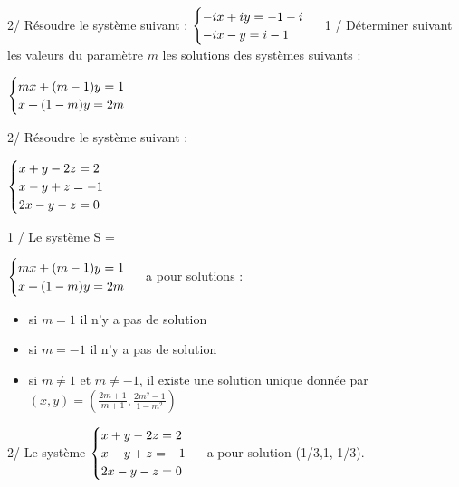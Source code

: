 \documentclass[11pt,a4paper]{amsart}
\theoremstyle{theorem}
\theoremstyle{definition}
\newcounter{numExercice}
\newcounter{qcounter}
\newcommand{\exo}[2]{\stepcounter{numExercice}\setcounter{qcounter}{0}\vspace{.3cm}\hangindent0em\hangafter=0%
\noindent{\textbf{Exercice \arabic{numExercice} (#2).} \textit{#1}}}
\begin{document}
{ \vspace{1cm}

 2/ Résoudre le système suivant :
 $
 \begin{cases}
 -ix+iy=-1-i\\
 -ix-y=i-1
 \end{cases} \\
 $
 1 / D\'eterminer suivant les valeurs du param\`etre $m$ les solutions des syst\`emes suivants :

 $
 \begin{cases}
 mx+(m-1)y=1\\
 x+(1-m)y=2m
 \end{cases} \\
 $

 \vspace{1cm}

 2/ Résoudre le système suivant :

 $
 \begin{cases}
 x+y-2z=2\\
 x-y+z=-1 \\
 2x-y-z=0
 \end{cases}\\
 $


 1 / Le système S = 

 $
 \begin{cases}
 mx+(m-1)y=1\\
 x+(1-m)y=2m
 \end{cases} \\
 $ a pour solutions :

 \begin{itemize}
 \item si $m=1$ il n'y a pas de solution
 \item si $m=-1$ il n'y a pas de solution
 \item si $m\neq 1$ et $m\neq -1$, il existe une solution unique donnée par $(x,y)=(\frac{2m+1}{m+1},\frac{2m^2-1}{1-m^2}) $
 \end{itemize}


 \vspace{1cm}

 2/ Le système $
 \begin{cases}
 x+y-2z=2\\
 x-y+z=-1 \\
 2x-y-z=0
 \end{cases}\\
 $
 a pour solution (1/3,1,-1/3).



}
\end{document}
